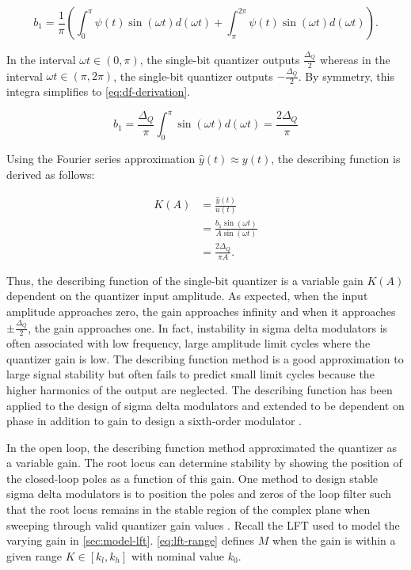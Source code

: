 \begin{equation*}
	b_1 = \frac{1}{\pi}\left(\int_0^\pi\psi(t)\sin(\omega t)d(\omega t) + \int_\pi^{2\pi}\psi(t)\sin(\omega t)d(\omega t)\right).
\end{equation*}

In the interval $\omega t \in (0, \pi)$, the single-bit quantizer outputs $\frac{\Delta_Q}{2}$ whereas in the interval $\omega t \in (\pi, 2\pi)$, the single-bit quantizer outputs $-\frac{\Delta_Q}{2}$. By symmetry, this integra simplifies to \autoref{eq:df-derivation}.

\begin{equation}
	b_1 = \frac{\Delta_Q}{\pi}\int_0^\pi \sin(\omega t)d(\omega t) = \frac{2\Delta_Q}{\pi} \label{eq:df-derivation}
\end{equation}

Using the Fourier series approximation $\hat{y}(t) \approx y(t)$, the describing function is derived as follows:

\begin{align*}
	K(A) &= \frac{\hat{y}(t)}{u(t)} \\
	&= \frac{b_1\sin(\omega t)}{A\sin(\omega t)} \\
	&= \frac{2\Delta_Q}{\pi A}.
\end{align*}

Thus, the describing function of the single-bit quantizer is a variable gain $K(A)$ dependent on the quantizer input amplitude. As expected, when the input amplitude approaches zero, the gain approaches infinity and when it approaches $\pm\frac{\Delta_Q}{2}$, the gain approaches one. In fact, instability in sigma delta modulators is often associated with low frequency, large amplitude limit cycles where the quantizer gain is low. The describing function method is a good approximation to large signal stability but often fails to predict small limit cycles because the higher harmonics of the output are neglected. The describing function has been applied to the design of sigma delta modulators \cite{Engelen1999} and extended to be dependent on phase in addition to gain to design a sixth-order modulator \cite{VanEngelen1999a}.

In the open loop, the describing function method approximated the quantizer as a variable gain. The root locus can determine stability by showing the position of the closed-loop poles as a function of this gain. One method to design stable sigma delta modulators is to position the poles and zeros of the loop filter such that the root locus remains in the stable region of the complex plane when sweeping through valid quantizer gain values \cite{Yang2002, Kuo2006, Kang2014}. Recall the \gls{LFT} used to model the varying gain in \autoref{sec:model-lft}. \autoref{eq:lft-range} defines $M$ when the gain is within a given range $K \in [k_l, k_h]$ with nominal value $k_0$.

